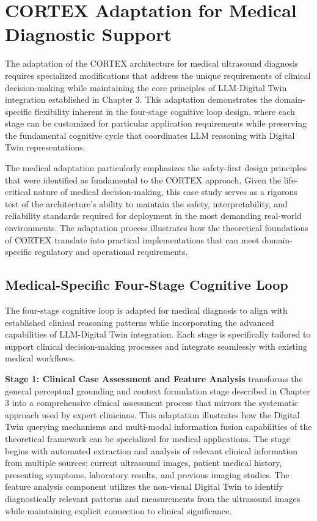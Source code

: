 \section{CORTEX Adaptation for Medical Diagnostic Support}

The adaptation of the CORTEX architecture for medical ultrasound diagnosis requires specialized modifications that address the unique requirements of clinical decision-making while maintaining the core principles of LLM-Digital Twin integration established in Chapter 3. This adaptation demonstrates the domain-specific flexibility inherent in the four-stage cognitive loop design, where each stage can be customized for particular application requirements while preserving the fundamental cognitive cycle that coordinates LLM reasoning with Digital Twin representations.

The medical adaptation particularly emphasizes the safety-first design principles that were identified as fundamental to the CORTEX approach. Given the life-critical nature of medical decision-making, this case study serves as a rigorous test of the architecture's ability to maintain the safety, interpretability, and reliability standards required for deployment in the most demanding real-world environments. The adaptation process illustrates how the theoretical foundations of CORTEX translate into practical implementations that can meet domain-specific regulatory and operational requirements.

\subsection{Medical-Specific Four-Stage Cognitive Loop}

The four-stage cognitive loop is adapted for medical diagnosis to align with established clinical reasoning patterns while incorporating the advanced capabilities of LLM-Digital Twin integration. Each stage is specifically tailored to support clinical decision-making processes and integrate seamlessly with existing medical workflows.

\textbf{Stage 1: Clinical Case Assessment and Feature Analysis} transforms the general perceptual grounding and context formulation stage described in Chapter 3 into a comprehensive clinical assessment process that mirrors the systematic approach used by expert clinicians. This adaptation illustrates how the Digital Twin querying mechanisms and multi-modal information fusion capabilities of the theoretical framework can be specialized for medical applications. The stage begins with automated extraction and analysis of relevant clinical information from multiple sources: current ultrasound images, patient medical history, presenting symptoms, laboratory results, and previous imaging studies. The feature analysis component utilizes the non-visual Digital Twin to identify diagnostically relevant patterns and measurements from the ultrasound images while maintaining explicit connection to clinical significance.

